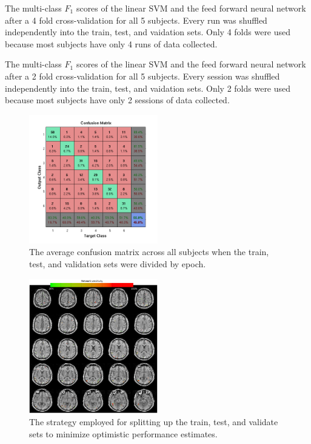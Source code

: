 \documentclass[twocolumn,final]{article}
\begin{document}
\begin{table}[!htbp]
\centering

\caption{
The multi-class $F_1$ scores of the linear SVM and the feed forward neural network after a 4 fold cross-validation for all 5 subjects. 
Every run was shuffled independently into the train, test, and vaidation sets. 
Only 4 folds were used because most subjects have only 4 runs of data collected.}
\label{tab:run-shuffle}
\end{table}

\begin{table}[!htbp]
\centering

\caption{The multi-class $F_1$ scores of the linear SVM and the feed forward neural network after a 2 fold cross-validation for all 5 subjects. 
Every session was shuffled independently into the train, test, and vaidation sets. 
Only 2 folds were used because most subjects have only 2 sessions of data collected.}
\label{tab:session-shuffle}
\end{table}

\begin{figure}[!htbp]
\centering
\includegraphics[width=0.5\textwidth]{figures/confusion-average}
\caption{The average confusion matrix across all subjects when the train, test, and validation sets were divided by epoch.}
\label{fig:confusion-average}
\end{figure}

\begin{figure}[!htbp]
\centering
\includegraphics[width=0.5\textwidth]{figures/sensitivity-analysis}
\caption{The strategy employed for splitting up the train, test, and validate sets to minimize optimistic performance estimates.}
\label{fig:sensitivity-analysis}
\end{figure}
\end{document}

